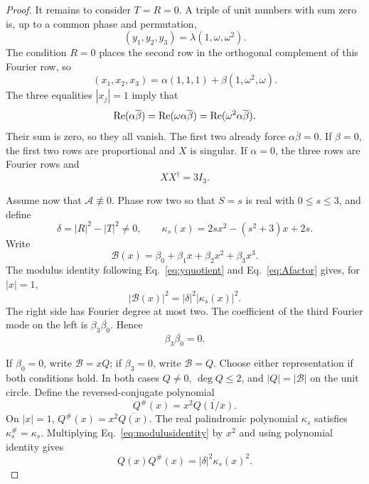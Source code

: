 \begin{proof}
It remains to consider $T=R=0$.  A triple of unit numbers with sum zero is, up to a common phase and permutation,
\begin{equation}
(y_1,y_2,y_3)=\lambda(1,\omega,\omega^2).
\label{eq:unitzerosum}
\end{equation}
The condition $R=0$ places the second row in the orthogonal complement of this Fourier row, so
\begin{equation}
(x_1,x_2,x_3)
=\alpha(1,1,1)+\beta(1,\omega^2,\omega).
\label{eq:xFourierdecomp}
\end{equation}
The three equalities $|x_j|=1$ imply that
\begin{equation}
\operatorname{Re}(\alpha\overline\beta)
=\operatorname{Re}(\omega\alpha\overline\beta)
=\operatorname{Re}(\omega^2\alpha\overline\beta).
\label{eq:threeRe}
\end{equation}
Their sum is zero, so they all vanish.  The first two already force $\alpha\overline\beta=0$.  If $\beta=0$, the first two rows are proportional and $X$ is singular.  If $\alpha=0$, the three rows are Fourier rows and
\begin{equation}
XX^{\dagger}=3I_3.
\label{eq:dependentFourier}
\end{equation}

Assume now that $\mathcal A\not\equiv0$. Phase row two so that $S=s$ is real with $0\leq s\leq3$, and define
\begin{equation}
\delta=|R|^2-|T|^2\neq0,
\qquad
\kappa_s(x)=2sx^2-(s^2+3)x+2s.
\label{eq:deltakappas}
\end{equation}
Write
\begin{equation}
\mathcal B(x)=\beta_0+\beta_1x+\beta_2x^2+\beta_3x^3.
\label{eq:Bbeta}
\end{equation}
The modulus identity following Eq.~\eqref{eq:yquotient} and Eq.~\eqref{eq:Afactor} gives, for $|x|=1$,
\begin{equation}
|\mathcal B(x)|^2=|\delta|^2|\kappa_s(x)|^2.
\label{eq:modulusidentity}
\end{equation}
The right side has Fourier degree at most two.  The coefficient of the third Fourier mode on the left is $\beta_3\overline{\beta_0}$.  Hence
\begin{equation}
\beta_3\overline{\beta_0}=0.
\label{eq:endcoefficient}
\end{equation}

If $\beta_0=0$, write $\mathcal B=xQ$; if $\beta_3=0$, write $\mathcal B=Q$.  Choose either representation if both conditions hold.  In both cases $Q\neq0$, $\deg Q\leq2$, and $|Q|=|\mathcal B|$ on the unit circle.  Define the reversed-conjugate polynomial
\begin{equation}
Q^{\#}(x)=x^2\overline{Q(1/\overline x)}.
\label{eq:Qsharp}
\end{equation}
On $|x|=1$, $Q^{\#}(x)=x^2\overline{Q(x)}$.  The real palindromic polynomial $\kappa_s$ satisfies $\kappa_s^{\#}=\kappa_s$. Multiplying Eq.~\eqref{eq:modulusidentity} by $x^2$ and using polynomial identity gives
\begin{equation}
Q(x)Q^{\#}(x)=|\delta|^2\kappa_s(x)^2.
\label{eq:QQsharp}
\end{equation}


\end{proof}

